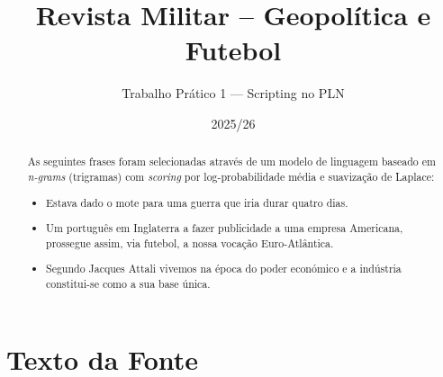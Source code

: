 \documentclass[a4paper,12pt]{article}
\title{Revista Militar -- Geopolítica e Futebol}
\author{Trabalho Prático 1 --- Scripting no PLN}
\date{2025/26}
\begin{document}
\maketitle

\begin{abstract}
As seguintes frases foram selecionadas através de um modelo de linguagem
baseado em \textit{n-grams} (trigramas) com \textit{scoring} por
log-probabilidade média e suavização de Laplace:
\begin{itemize}
  \item Estava dado o mote para uma guerra que iria durar quatro dias.
  \item Um português em Inglaterra a fazer publicidade a uma empresa Americana, prossegue assim, via futebol, a nossa vocação Euro-Atlântica.
  \item Segundo Jacques Attali vivemos na época do poder económico e a indústria constitui-se como a sua base única.
\end{itemize}
\end{abstract}

\section{Texto da Fonte}
\end{document}
